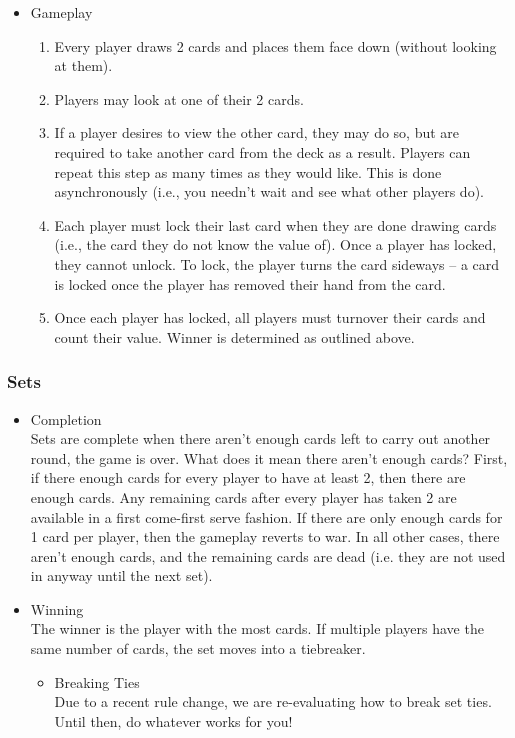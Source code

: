 \documentclass[11pt]{article}
\begin{document}
\begin{itemize}
\item Gameplay\\
\label{sec-2-2-2-2}%
\begin{enumerate}
\item Every player draws 2 cards and places them face down (without
   looking at them).
\item Players may look at one of their 2 cards.
\item If a player desires to view the other card, they may do so, but
   are required to take another card from the deck as a result.
   Players can repeat this step as many times as they would like. This
   is done asynchronously (i.e., you needn't wait and see what other
   players do).
\item Each player must lock their last card when they are done
   drawing cards (i.e., the card they do not know the value of). Once
   a player has locked, they cannot unlock. To lock, the player turns
   the card sideways -- a card is locked once the player has removed
   their hand from the card.
\item Once each player has locked, all players must turnover their cards
   and count their value. Winner is determined as
   outlined above.
\end{enumerate}

\end{itemize} %
\subsubsection{Sets}
\label{sec-2-2-3}
\begin{itemize}

\item Completion\\
\label{sec-2-2-3-1}%
Sets are complete when there aren't enough cards left to carry out
another round, the game is over. What does it mean there aren't enough
cards? First, if there enough cards for every player to have at least
2, then there are enough cards. Any remaining cards after every player
has taken 2 are available in a first come-first serve fashion. If
there are only enough cards for 1 card per player, then the gameplay
reverts to war. In all other cases, there aren't enough cards, and the
remaining cards are dead (i.e. they are not used in anyway until the
next set). 


\item Winning\\
\label{sec-2-2-3-2}%
The winner is the player with the most cards. If multiple players have
the same number of cards, the set moves into a tiebreaker. 




\begin{itemize}

\item Breaking Ties\\
\label{sec-2-2-3-2-1}%
Due to a recent rule change, we are re-evaluating how to break set
ties. Until then, do whatever works for you!

\end{itemize} %
\end{itemize} %
\end{document}
